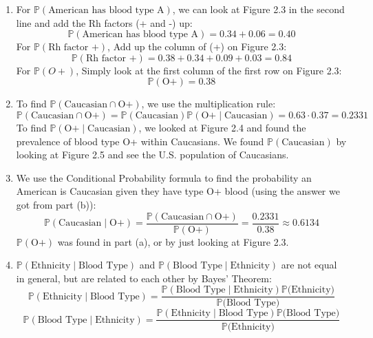 \documentclass{jhwhw}
\begin{document}
    \solution
        \begin{enumerate}
            \item For \(\mathbb{P}(\text{American has blood type A})\), we can look at Figure 2.3 in the second line and add the Rh factors (+ and -) up:
            \[
                \mathbb{P}(\text{American has blood type A}) = 0.34 + 0.06 = 0.40
            \]
            For \(\mathbb{P}(\text{Rh factor +})\), Add up the column of (+) on Figure 2.3:
            \[
                \mathbb{P}(\text{Rh factor +}) = 0.38 + 0.34 + 0.09 + 0.03 = 0.84
            \]
            For \(\mathbb{P}(O+)\), Simply look at the first column of the first row on Figure 2.3:
            \[
                \mathbb{P}(\text{O+}) = 0.38
            \]
            \item To find \(\mathbb{P}(\text{Caucasian} \cap \text{O+})\), we use the multiplication rule:
            \[
                \mathbb{P}(\text{Caucasian} \cap \text{O+}) = \mathbb{P}(\text{Caucasian})\mathbb{P}(\text{O+} \mid \text{Caucasian}) = 0.63 \cdot 0.37 = 0.2331
            \]
            To find \(\mathbb{P}(\text{O+} \mid \text{Caucasian})\), we looked at Figure 2.4 and found the prevalence of blood
            type O+ within Caucasians. We found \(\mathbb{P}(\text{Caucasian})\) by looking at Figure 2.5 and see the
            U.S. population of Caucasians.
            \item We use the Conditional Probability formula to find the probability an American is Caucasian given they have type 
            O+ blood (using the answer we got from part (b)):
            \[
                \mathbb{P}(\text{Caucasian} \mid \text{O+}) = \frac{\mathbb{P}(\text{Caucasian} \cap \text{O+})}{\mathbb{P}(\text{O+})} = \frac{0.2331}{0.38} \approx 0.6134
            \]
            \(\mathbb{P}(\text{O+})\) was found in part (a), or by just looking at Figure 2.3.
            \item $\mathbb{P}(\text{Ethnicity} \mid \text{Blood Type})$ and $\mathbb{P}(\text{Blood Type} \mid \text{Ethnicity})$ are not equal in
            general, but are related to each other by Bayes' Theorem:
            \[
                \mathbb{P}(\text{Ethnicity} \mid \text{Blood Type}) = \frac{\mathbb{P}(\text{Blood Type} \mid \text{Ethnicity})\mathbb{P}(\text{Ethnicity)}}{\mathbb{P}(\text{Blood Type)}}
            \]
            \[
                 \mathbb{P}(\text{Blood Type} \mid \text{Ethnicity}) = \frac{\mathbb{P}(\text{Ethnicity} \mid \text{Blood Type})\mathbb{P}(\text{Blood Type)}}{\mathbb{P}(\text{Ethnicity)}}
            \]
    
        \end{enumerate}
\end{document}
